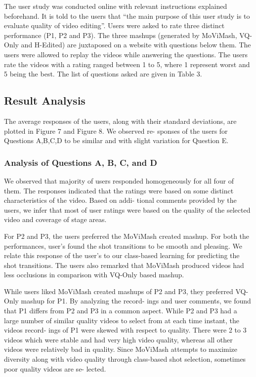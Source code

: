 \documentclass{sig-alternate}
\begin{document}
The user study was conducted online with relevant instructions
explained beforehand. It is told to the users that “the main purpose
of this user study is to evaluate quality of video editing”. Users
were asked to rate three distinct performance (P1, P2 and P3). The
three mashups (generated by MoViMash, VQ-Only and H-Edited)
are juxtaposed on a website with questions below them. The users
were allowed to replay the videos while answering the questions.
The users rate the videos with a rating ranged between 1 to 5, where
1 represent worst and 5 being the best. The list of questions asked
are given in Table 3.

\subsection{Result Analysis}
The average responses of the users, along with their standard
deviations, are plotted in Figure 7 and Figure 8. We observed re-
sponses of the users for Questions A,B,C,D to be similar and with
slight variation for Question E.

\subsubsection{Analysis of Questions A, B, C, and D}
We observed that majority of users responded homogeneously
for all four of them. The responses indicated that the ratings were
based on some distinct characteristics of the video. Based on addi-
tional comments provided by the users, we infer that most of user
ratings were based on the quality of the selected video and coverage
of stage areas.

For P2 and P3, the users preferred the MoViMash created mashup.
For both the performances, user’s found the shot transitions to be
smooth and pleasing. We relate this response of the user’s to our
class-based learning for predicting the shot transitions. The users
also remarked that MoViMash produced videos had less occlusions
in comparison with VQ-Only based mashup.

While users liked MoViMash created mashups of P2 and P3,
they preferred VQ-Only mashup for P1. By analyzing the record-
ings and user comments, we found that P1 differs from P2 and P3 in
a common aspect. While P2 and P3 had a large number of similar
quality videos to select from at each time instant, the videos record-
ings of P1 were skewed with respect to quality. There were 2 to 3
videos which were stable and had very high video quality, whereas
all other videos were relatively bad in quality. Since MoViMash
attempts to maximize diversity along with video quality through
class-based shot selection, sometimes poor quality videos are se-
lected.
\end{document}
